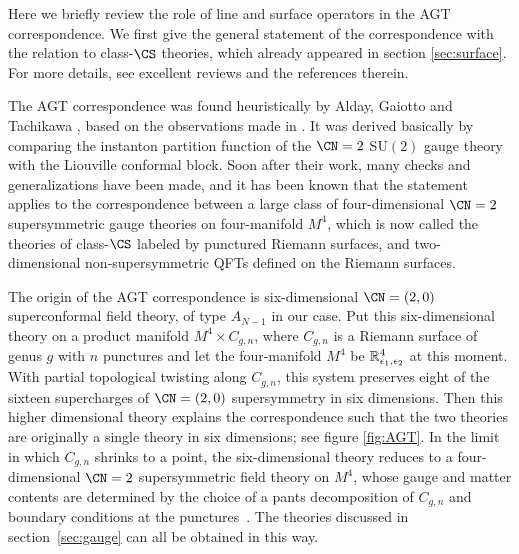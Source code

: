 Here we briefly review  the role of line and surface operators
in the AGT correspondence.
We first give the general statement
of the correspondence with the relation to class-$\CS$ theories,
which already appeared in section \ref{sec:surface}.
For more details, see excellent reviews \cite{LeFloch:2020uop,Okuda:2014fja,Gukov:2014gja}
and the references therein.

The AGT correspondence was found heuristically by Alday,
Gaiotto and Tachikawa \cite{Alday:2009aq}, based on the observations
made in \cite{Gaiotto:2009we}. It was derived basically by comparing
the instanton partition function \cite{Nekrasov:2002qd} of the $\CN =2$ SU$(2)$
gauge theory with the Liouville conformal block.
Soon after their work, many checks and generalizations have been made, and
it has been known that the statement applies to the correspondence between a large class
of four-dimensional $\CN = 2$ supersymmetric gauge theories on four-manifold $M^4$,
which is now called the theories of class-$\CS$ labeled by punctured Riemann
surfaces, %
and two-dimensional non-supersymmetric QFTs defined on the Riemann surfaces.

The origin of the AGT correspondence is six-dimensional $\CN = (2,0)$ superconformal field theory,
of type $A_{N-1}$ in our case.
Put this six-dimensional theory on a product manifold $M^4\times C_{g,n}$,
where $C_{g,n}$ is a Riemann surface of genus $g$ with $n$ punctures
and let the four-manifold $M^4$ be
$\mathbb{R}^4_{\epsilon_1,\epsilon_2}$
at this moment.
With partial topological twisting along $C_{g,n}$, this system
preserves eight of the sixteen supercharges of $\CN = (2,0)$
supersymmetry in six dimensions.
Then this higher dimensional
theory explains the correspondence such that the two theories are
originally a single theory in six dimensions; see figure \ref{fig:AGT}.
In the limit in which $C_{g,n}$ shrinks to a point, the
six-dimensional theory reduces to a four-dimensional $\CN = 2$
supersymmetric field theory on $M^4$, %
whose gauge and matter
contents are determined by the choice of a pants decomposition of
$C_{g,n}$ and boundary conditions at the
punctures~\cite{Gaiotto:2009we, Gaiotto:2009hg}.  The theories
discussed in section~\ref{sec:gauge} can all be obtained in this way.


